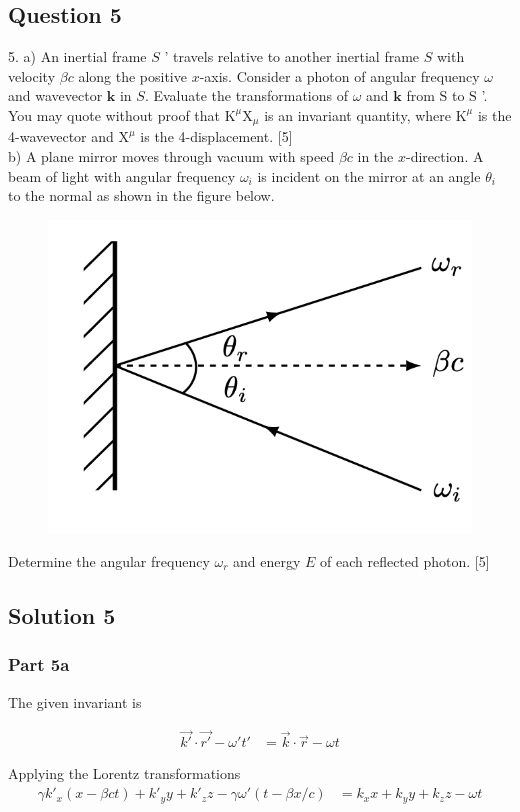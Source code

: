 \documentclass{article}
\begin{document}
\subsection{Question 5}
5. a) An inertial frame $S$ ' travels relative to another inertial frame $S$ with velocity $\beta c$ along the positive $x$-axis. Consider a photon of angular frequency $\omega$ and wavevector $\mathbf{k}$ in $S$. Evaluate the transformations of $\omega$ and $\mathbf{k}$ from $\mathrm{S}$ to $\mathrm{S}$ '. You may quote without proof that $\mathrm{K}^{\mu} \mathrm{X}_{\mu}$ is an invariant quantity, where $\mathrm{K}^{\mu}$ is the 4-wavevector and $\mathrm{X}^{\mu}$ is the 4-displacement. [5] \\
b) A plane mirror moves through vacuum with speed $\beta c$ in the $x$-direction. A beam of light with angular frequency $\omega_{i}$ is incident on the mirror at an angle $\theta_{i}$ to the normal as shown in the figure below. 
\begin{figure}
	\centering
	\includegraphics[width=0.5\linewidth]{spho_book_TYS_images/2017q5.png}
	\caption{}
\end{figure}
Determine the angular frequency $\omega_{r}$ and energy $E$ of each reflected photon. [5]

\subsection{Solution 5}

\subsubsection{Part 5a}
The given invariant is 

\begin{align}
    \vec{k'}\cdot\vec{r'} - \omega' t' &= \vec{k} \cdot \vec{r} - \omega t
\end{align}

Applying the Lorentz transformations
\begin{align}
    \gamma k'_x(x-\beta c t) + k'_y y + k'_z z - \gamma \omega' (t-\beta x/c) &= k_x x + k_yy +k_zz-\omega t
\end{align}
\end{document}
